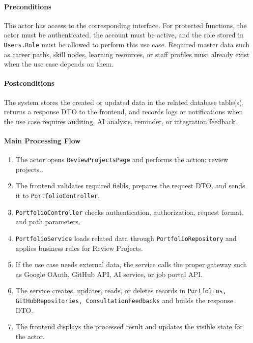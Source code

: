 \paragraph{Preconditions}

The actor has access to the corresponding interface. For protected functions, the actor must be authenticated, the account must be active, and the role stored in \texttt{Users.Role} must be allowed to perform this use case. Required master data such as career paths, skill nodes, learning resources, or staff profiles must already exist when the use case depends on them.

\paragraph{Postconditions}

The system stores the created or updated data in the related database table(s), returns a response DTO to the frontend, and records logs or notifications when the use case requires auditing, AI analysis, reminder, or integration feedback.

\paragraph{Main Processing Flow}

\begin{enumerate}
    \item The actor opens \texttt{ReviewProjectsPage} and performs the action: review projects..
    \item The frontend validates required fields, prepares the request DTO, and sends it to \texttt{PortfolioController}.
    \item \texttt{PortfolioController} checks authentication, authorization, request format, and path parameters.
    \item \texttt{PortfolioService} loads related data through \texttt{PortfolioRepository} and applies business rules for Review Projects.
    \item If the use case needs external data, the service calls the proper gateway such as Google OAuth, GitHub API, AI service, or job portal API.
    \item The service creates, updates, reads, or deletes records in \texttt{Portfolios, GitHubRepositories, ConsultationFeedbacks} and builds the response DTO.
    \item The frontend displays the processed result and updates the visible state for the actor.
\end{enumerate}

